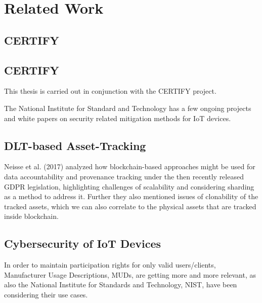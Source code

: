 \chapter{Related Work}


\section{CERTIFY}
\section{CERTIFY} %
\label{sec:CERTIFY}

This thesis is carried out in conjunction with the CERTIFY project.

The National Institute for Standard and Technology has a few ongoing projects and white papers on security related
mitigation methods for IoT devices.



\section{DLT-based Asset-Tracking} %
\label{sec:DLT-based Asset-Tracking}

Neisse et al. (2017) analyzed how blockchain-based approaches might be used for data accountability and provenance
tracking under the then recently released GDPR legislation, highlighting challenges of scalability and considering
sharding as a method to address it. \cite{neisse2017blockchain} Further they also mentioned issues of clonability of
the tracked assets, which we can also correlate to the physical assets that are tracked inside blockchain.



\section{Cybersecurity of IoT Devices} %
\label{sec:Cybersecurity of IoT Devices}


In order to maintain participation rights for only valid users/clients, Manufacturer Usage Descriptions, MUDs, are
getting more and more relevant, as also the National Institute for Standards and Technology, NIST, have been considering
their use cases. \cite{dodson2021securing}


